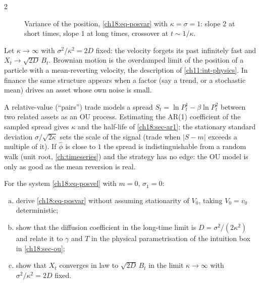 \begin{paracol}{2}
\begin{figure}[ht]
\caption{Variance of the position, \eqref{ch18:eq-posvar} with $\kappa=\sigma=1$: slope $2$ at short times, slope $1$ at long times, crossover at $t\sim1/\kappa$.}\label{ch18:fig-posvar}
\end{figure}
\begin{intuition}
Let $\kappa\to\infty$ with $\sigma^2/\kappa^2=2D$ fixed: the velocity forgets its past infinitely fast and $X_t\to\sqrt{2D}\,B_t$. Brownian motion is the overdamped limit of the position of a particle with a mean-reverting velocity, the description of \cref{ch11:int-physics}. In finance the same structure appears when a factor (say a trend, or a stochastic mean) drives an asset whose own noise is small.
\end{intuition}
\begin{finance}
A relative-value (``pairs'') trade models a spread $S_t=\ln P^1_t-\beta\ln P^2_t$ between two related assets as an OU process. Estimating the AR(1) coefficient of the sampled spread gives $\kappa$ and the half-life of \cref{ch18:sec-ar1}; the stationary standard deviation $\sigma/\sqrt{2\kappa}$ sets the scale of the signal (trade when $|S-m|$ exceeds a multiple of it). If $\hat\phi$ is close to $1$ the spread is indistinguishable from a random walk (unit root, \cref{ch:timeseries}) and the strategy has no edge: the OU model is only as good as the mean reversion is real.
\end{finance}

\begin{exercise}\label{ch18:ex-posvel}
For the system \eqref{ch18:eq-posvel} with $m=0$, $\sigma_1=0$:
\begin{enumerate}[(a)]
  \item derive \eqref{ch18:eq-posvar} without assuming stationarity of $V_0$, taking $V_0=v_0$ deterministic;
  \item show that the diffusion coefficient in the long-time limit is $D=\sigma^2/(2\kappa^2)$ and relate it to $\gamma$ and $T$ in the physical parametrisation of the intuition box in \cref{ch18:sec-ou};
  \item show that $X_t$ converges in law to $\sqrt{2D}\,B_t$ in the limit $\kappa\to\infty$ with $\sigma^2/\kappa^2=2D$ fixed.
\end{enumerate}
\end{exercise}


\end{paracol}
